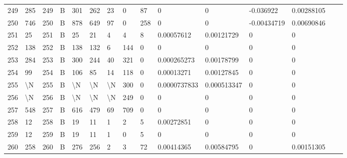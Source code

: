 \begin{longtable}{lllllllllllllll}
	249 & 285               & 249 & B   & 301               & 262               & 23                & 0    & 87         & 0              & 0              & -0.036922     & 0.00288105   \\
	250 & 746               & 250 & B   & 878               & 649               & 97                & 0    & 258        & 0              & 0              & -0.00434719   & 0.00690846   \\
	251 & 25                & 251 & B   & 25                & 21                & 4                 & 4    & 8          & 0.00057612     & 0.00121729     & 0             & 0            \\
	252 & 138               & 252 & B   & 138               & 132               & 6                 & 144  & 0          & 0              & 0              & 0             & 0            \\
	253 & 284               & 253 & B   & 300               & 244               & 40                & 321  & 0          & 0.000265273    & 0.00178799     & 0             & 0            \\
	254 & 99                & 254 & B   & 106               & 85                & 14                & 118  & 0          & 0.00013271     & 0.00127845     & 0             & 0            \\
	255 & \textbackslash{}N & 255 & B   & \textbackslash{}N & \textbackslash{}N & \textbackslash{}N & 300  & 0          & 0.0000737833   & 0.000513347    & 0             & 0            \\
	256 & \textbackslash{}N & 256 & B   & \textbackslash{}N & \textbackslash{}N & \textbackslash{}N & 249  & 0          & 0              & 0              & 0             & 0            \\
	257 & 548               & 257 & B   & 616               & 479               & 69                & 709  & 0          & 0              & 0              & 0             & 0            \\
	258 & 12                & 258 & B   & 19                & 11                & 1                 & 2    & 5          & 0.00272851     & 0              & 0             & 0            \\
	259 & 12                & 259 & B   & 19                & 11                & 1                 & 0    & 5          & 0              & 0              & 0             & 0            \\
	260 & 258               & 260 & B   & 276               & 256               & 2                 & 3    & 72         & 0.00414365     & 0.00584795     & 0             & 0.00151305   \\

\end{longtable}
